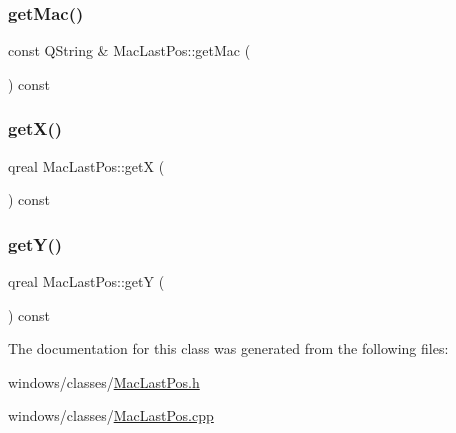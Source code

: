 \subsubsection{\texorpdfstring{get\+Mac()}{getMac()}}
{\footnotesize\ttfamily const Q\+String \& Mac\+Last\+Pos\+::get\+Mac (\begin{DoxyParamCaption}{ }\end{DoxyParamCaption}) const}

\mbox{\label{class_mac_last_pos_a5a537ae1bbf002320e9fbd508ac8ea4a}} 
\subsubsection{\texorpdfstring{get\+X()}{getX()}}
{\footnotesize\ttfamily qreal Mac\+Last\+Pos\+::getX (\begin{DoxyParamCaption}{ }\end{DoxyParamCaption}) const}

\mbox{\label{class_mac_last_pos_adcb9df2aa31412ee81944255f3b48d3c}} 
\subsubsection{\texorpdfstring{get\+Y()}{getY()}}
{\footnotesize\ttfamily qreal Mac\+Last\+Pos\+::getY (\begin{DoxyParamCaption}{ }\end{DoxyParamCaption}) const}



The documentation for this class was generated from the following files\+:\begin{DoxyCompactItemize}
\item 
windows/classes/\hyperlink{_mac_last_pos_8h}{Mac\+Last\+Pos.\+h}\item 
windows/classes/\hyperlink{_mac_last_pos_8cpp}{Mac\+Last\+Pos.\+cpp}\end{DoxyCompactItemize}
